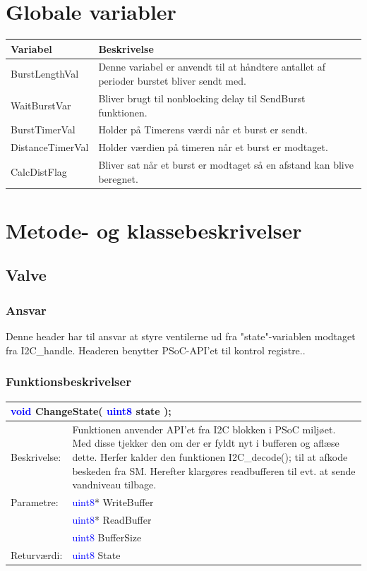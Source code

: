 \section{Globale variabler}
\begin{table}[H]
\begin{tabular}{|l|p{10cm}|}
\hline
\cellcolor[gray]{0.8}\textbf{Variabel} &\cellcolor[gray]{0.8} \textbf{Beskrivelse}\\ \hline
BurstLengthVal & Denne variabel er anvendt til at håndtere antallet af perioder burstet bliver sendt med.\\ \hline
WaitBurstVar & Bliver brugt til nonblocking delay til SendBurst funktionen.\\ \hline
BurstTimerVal & Holder på Timerens værdi når et burst er sendt.\\ \hline
DistanceTimerVal & Holder værdien på timeren når et burst er modtaget. \\ \hline
CalcDistFlag & Bliver sat når et burst er modtaget så en afstand kan blive beregnet.\\ \hline
\end{tabular}
\end{table}
\section{Metode- og klassebeskrivelser}
\subsection{Valve}
\subsubsection{Ansvar}
Denne header har til ansvar at styre ventilerne ud fra "state"-variablen modtaget fra I2C\_handle. Headeren benytter PSoC-API'et til kontrol registre..
\subsubsection{Funktionsbeskrivelser}
 
\begin{table}[H]
\begin{tabular}{l p{12.5cm}}
\multicolumn{2}{l}{\textcolor{blue}{void} ChangeState( \textcolor{blue}{uint8} state );} \\
\hline
Beskrivelse:& Funktionen anvender API'et fra I2C blokken i PSoC miljøet. Med disse tjekker den om der er fyldt nyt i bufferen og aflæse dette. Herfer kalder den funktionen I2C\_decode(); til at afkode beskeden fra SM. Herefter klargøres readbufferen til evt. at sende vandniveau tilbage. \\
Parametre:&\textcolor{blue}{uint8}* WriteBuffer\\
&\textcolor{blue}{uint8}* ReadBuffer\\
&\textcolor{blue}{uint8} BufferSize \\
Returværdi:& \textcolor{blue}{uint8} State\\
\end{tabular}
\end{table}

